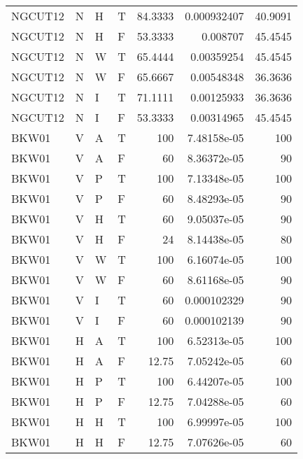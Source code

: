 \begin{longtable}{llllrrr}
    NGCUT12  & N     & H     & T          & 84.3333    & 0.000932407 & 40.9091  \\
    NGCUT12  & N     & H     & F          & 53.3333    & 0.008707    & 45.4545  \\
    NGCUT12  & N     & W     & T          & 65.4444    & 0.00359254  & 45.4545  \\
    NGCUT12  & N     & W     & F          & 65.6667    & 0.00548348  & 36.3636  \\
    NGCUT12  & N     & I     & T          & 71.1111    & 0.00125933  & 36.3636  \\
    NGCUT12  & N     & I     & F          & 53.3333    & 0.00314965  & 45.4545  \\
    BKW01    & V     & A     & T          & 100        & 7.48158e-05 & 100      \\
    BKW01    & V     & A     & F          & 60         & 8.36372e-05 & 90       \\
    BKW01    & V     & P     & T          & 100        & 7.13348e-05 & 100      \\
    BKW01    & V     & P     & F          & 60         & 8.48293e-05 & 90       \\
    BKW01    & V     & H     & T          & 60         & 9.05037e-05 & 90       \\
    BKW01    & V     & H     & F          & 24         & 8.14438e-05 & 80       \\
    BKW01    & V     & W     & T          & 100        & 6.16074e-05 & 100      \\
    BKW01    & V     & W     & F          & 60         & 8.61168e-05 & 90       \\
    BKW01    & V     & I     & T          & 60         & 0.000102329 & 90       \\
    BKW01    & V     & I     & F          & 60         & 0.000102139 & 90       \\
    BKW01    & H     & A     & T          & 100        & 6.52313e-05 & 100      \\
    BKW01    & H     & A     & F          & 12.75      & 7.05242e-05 & 60       \\
    BKW01    & H     & P     & T          & 100        & 6.44207e-05 & 100      \\
    BKW01    & H     & P     & F          & 12.75      & 7.04288e-05 & 60       \\
    BKW01    & H     & H     & T          & 100        & 6.99997e-05 & 100      \\
    BKW01    & H     & H     & F          & 12.75      & 7.07626e-05 & 60       \\

\end{longtable}
